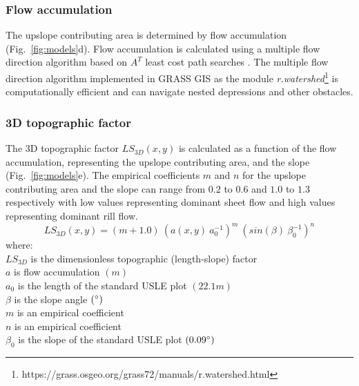 \documentclass[esurf, manuscript]{copernicus}
\begin{document}

\subsubsection{Flow accumulation}

The upslope contributing area is determined by flow accumulation
(Fig.~\ref{fig:models}d). 
Flow accumulation is calculated using a multiple flow direction algorithm \citep{Metz2009} 
based on $A^{T}$ least cost path searches \citep{Ehlschlaeger1989}. 
The multiple flow direction algorithm 
implemented in GRASS GIS as the module 
\textit{r.watershed}\footnote{https://grass.osgeo.org/grass72/manuals/r.watershed.html}
is computationally efficient and can
navigate nested depressions and other obstacles. 


\subsubsection{3D topographic factor}

The 3D topographic factor $LS_{3D}(x,y)$
is calculated as a function of 
the flow accumulation,
representing the upslope contributing area,
and the slope 
(Fig.~\ref{fig:models}e). 
%
The empirical coefficients $m$ and $n$
for the upslope contributing area 
and the slope
can range from $0.2$ to $0.6$
and $1.0$ to $1.3$ respectively
with low values representing dominant sheet flow
and high values representing dominant rill flow.
%
\begin{equation}
\label{eq:ls_factor}
{LS_{3D}(x,y) = (m+1.0) ~ (a(x,y) ~ a_0^{-1})^{m} ~ (sin(\beta) ~ \beta_0^{-1})^{n}}
\end{equation}
%
{\small
\noindent
where: \\
\noindent
\hspace*{0.5em} $LS_{3D}$ is the dimensionless topographic (length-slope) factor\\
\hspace*{0.5em} $a$ is flow accumulation $(m)$\\
\hspace*{0.5em} $a_0$ is the length of the standard USLE plot $(22.1 m)$\\
\hspace*{0.5em} $\beta$ is the slope angle $(^{\circ})$\\
\hspace*{0.5em} $m$ is an empirical coefficient\\
\hspace*{0.5em} $n$ is an empirical coefficient\\
\hspace*{0.5em} $\beta_0$ is the slope of the standard USLE plot $(0.09 ^{\circ})$\\
}
\end{document}
